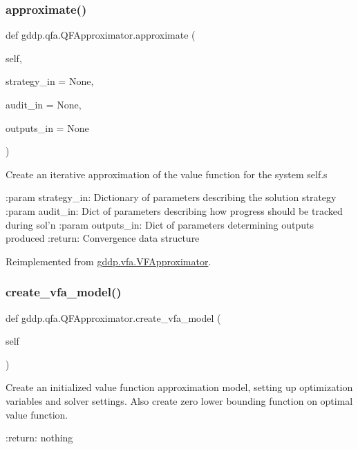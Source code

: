 \subsubsection{\texorpdfstring{approximate()}{approximate()}}
{\footnotesize\ttfamily def gddp.\+qfa.\+Q\+F\+Approximator.\+approximate (\begin{DoxyParamCaption}\item[{}]{self,  }\item[{}]{strategy\+\_\+in = {\ttfamily None},  }\item[{}]{audit\+\_\+in = {\ttfamily None},  }\item[{}]{outputs\+\_\+in = {\ttfamily None} }\end{DoxyParamCaption})}

\begin{DoxyVerb}Create an iterative approximation of the value function for the system self.s

:param strategy_in: Dictionary of parameters describing the solution strategy
:param audit_in: Dict of parameters describing how progress should be tracked during sol'n
:param outputs_in: Dict of parameters determining outputs produced
:return: Convergence data structure
\end{DoxyVerb}
 

Reimplemented from \mbox{\hyperlink{classgddp_1_1vfa_1_1_v_f_approximator_a8eab71f7f7d2f248904874fc364fedc5}{gddp.\+vfa.\+V\+F\+Approximator}}.

\mbox{\label{classgddp_1_1qfa_1_1_q_f_approximator_a955edba3bc147309cbc8d786e6cbc2db}} 
\subsubsection{\texorpdfstring{create\_vfa\_model()}{create\_vfa\_model()}}
{\footnotesize\ttfamily def gddp.\+qfa.\+Q\+F\+Approximator.\+create\+\_\+vfa\+\_\+model (\begin{DoxyParamCaption}\item[{}]{self }\end{DoxyParamCaption})}

\begin{DoxyVerb}Create an initialized value function approximation model, setting up optimization
variables and solver settings. Also create zero lower bounding function on optimal value
function.

:return: nothing
\end{DoxyVerb}
 

